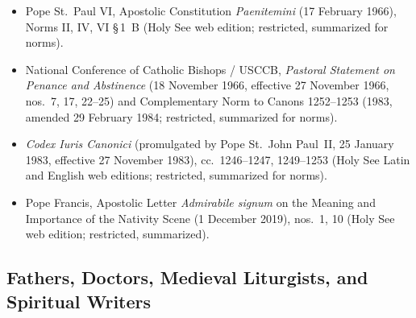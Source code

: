 \begin{itemize}
(25 July 1960) and Sacred Congregation of Rites, \textit{Codex Rubricarum}
(26 July 1960), \textit{Acta Apostolicae Sedis} 52 (1960), pp.~593--740
(RG nn.~11, 15, 20, 24--25, 30, 71, 91, 109, 111~a, 131, 137; RGBR nn.~162~a,
213, 220, 222~a; RGMR nn.~299, 507).
\item Pope St.~Paul VI, Apostolic Constitution \textit{Paenitemini}
(17 February 1966), Norms II, IV, VI \S\,1~B (Holy See web edition; restricted,
summarized for norms).
\item National Conference of Catholic Bishops / USCCB, \textit{Pastoral
Statement on Penance and Abstinence} (18 November 1966, effective 27 November
1966, nos.~7, 17, 22--25) and Complementary Norm to Canons 1252--1253 (1983,
amended 29 February 1984; restricted, summarized for norms).
\item \textit{Codex Iuris Canonici} (promulgated by Pope St.~John Paul~II,
25 January 1983, effective 27 November 1983), cc.~1246--1247, 1249--1253 (Holy
See Latin and English web editions; restricted, summarized for norms).
\item Pope Francis, Apostolic Letter \textit{Admirabile signum} on the Meaning
and Importance of the Nativity Scene (1 December 2019), nos.~1, 10 (Holy See
web edition; restricted, summarized).
\end{itemize}

\subsection{Fathers, Doctors, Medieval Liturgists, and Spiritual Writers}

